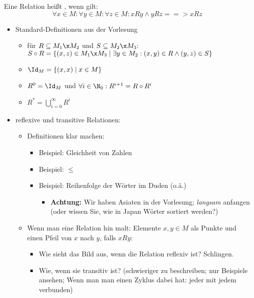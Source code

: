 Eine Relation heißt , wenn gilt:
\[
\forall x\in M: \forall y\in M: \forall z\in M: x R y \land y R z ==>
x R z
\]
%
\begin{tutorium}
  \noindent
  \begin{itemize}
  \item Standard-Definitionen aus der Vorlesung
    \begin{itemize}
    \item für  $R\subseteq M_1\x M_2$ und $S\subseteq M_2\x M_3$:\\
      $ S\circ R = \{ (x,z)\in M_1\x M_3 \mid \exists y\in M_2:
      (x,y)\in R \land (y,z)\in S \}$
    \item $\Id_M = \{ (x,x) \mid x\in M \}$
    \item $R^0 = \Id_M$ und $\forall i\in \N_0: R^{i+1} = R \circ R^i$
    \item $R^* = \bigcup_{i=0}^{\infty} R^i$
    \end{itemize}
  \item reflexive und transitive Relationen:
    \begin{itemize}
    \item Definitionen klar machen:
      \begin{itemize}
      \item Beispiel: Gleichheit von Zahlen
      \item Beispiel: $\leq$
      \item Beispiel: Reihenfolge der Wörter im Duden (o.ä.)
        \begin{itemize}
        \item \textbf{Achtung:} Wir haben Asiaten in der Vorlesung;
          \emph{langsam} anfangen (oder wissen Sie, wie in Japan
          Wörter sortiert werden?)
        \end{itemize}
      \end{itemize}
    \item Wenn man eine Relation hin malt: Elemente $x,y\in M$ als
      Punkte und einen Pfeil von $x$ nach $y$, falls $x R y$: 
      \begin{itemize}
      \item Wie sieht das Bild aus, wenn die Relation reflexiv ist?
        Schlingen.
      \item Wie, wenn sie transitiv ist? (schwieriger zu beschreiben;
        nur Beispiele ansehen; Wenn man man einen Zyklus dabei hat:
        jeder mit jedem verbunden)
      \end{itemize}

\end{itemize}
\end{itemize}
\end{tutorium}
